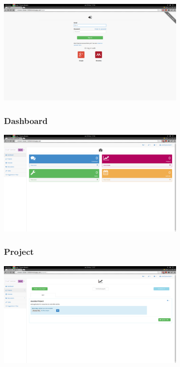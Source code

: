\begin{center}
\includegraphics[height=200px, width=350px]{./img/dsgn_img/login.png}
	
\end{center}

\subsubsection{Dashboard}

\begin{center}
\includegraphics[height=200px, width=350px]{./img/dsgn_img/dashboard.png}
	
\end{center}

\subsubsection{Project}

\begin{center}
\includegraphics[height=200px, width=350px]{./img/dsgn_img/project.png}
	
\end{center}
